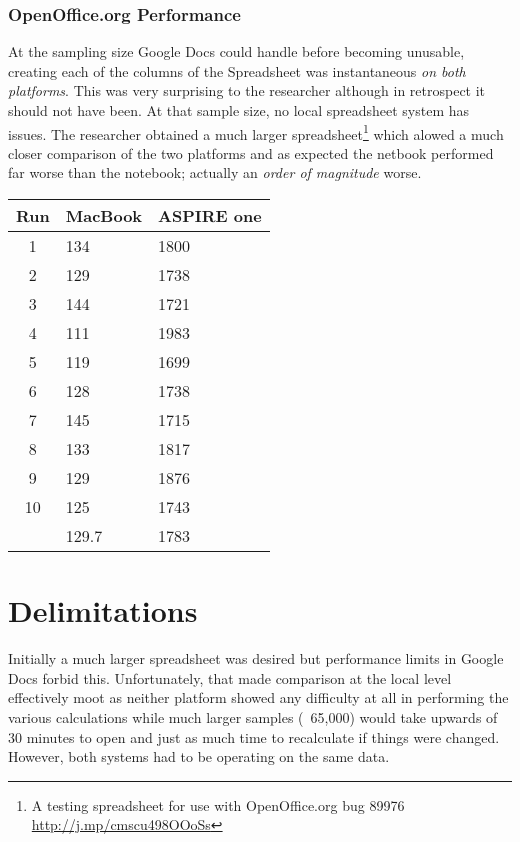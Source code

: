 \documentclass[12pt,oneside,letterpaper,titlepage]{article}
\begin{document}
\subsubsection{OpenOffice.org Performance}

At the sampling size Google Docs could handle before becoming unusable, creating
each of the columns of the Spreadsheet was instantaneous \emph{on both
  platforms}.  This was very surprising to the researcher although in retrospect
it should not have been.  At that sample size, no local spreadsheet system has
issues.  The researcher obtained a much larger spreadsheet\footnote{A testing
  spreadsheet for use with OpenOffice.org bug 89976
  \url{http://j.mp/cmscu498OOoSs}} which alowed a much closer comparison of the
two platforms and as expected the netbook performed far worse than the notebook;
actually an \emph{order of magnitude} worse.

\begin{tabular}{| c | l | l |}
  \hline
  Run  & MacBook & ASPIRE one \\ \hline
  1    & 134     & 1800       \\ \hline
  2    & 129     & 1738       \\ \hline
  3    & 144     & 1721       \\ \hline
  4    & 111     & 1983       \\ \hline
  5    & 119     & 1699       \\ \hline
  6    & 128     & 1738       \\ \hline
  7    & 145     & 1715       \\ \hline
  8    & 133     & 1817       \\ \hline
  9    & 129     & 1876       \\ \hline
  10   & 125     & 1743       \\ \hline
       & 129.7   & 1783       \\
  \hline
\end{tabular}

\section{Delimitations}


Initially a much larger spreadsheet was desired but performance limits in Google
Docs forbid this.  Unfortunately, that made comparison at the local level
effectively moot as neither platform showed any difficulty at all in performing
the various calculations while much larger samples (~65,000) would take upwards
of 30 minutes to open and just as much time to recalculate if things were
changed.  However, both systems had to be operating on the same data.
\end{document}
